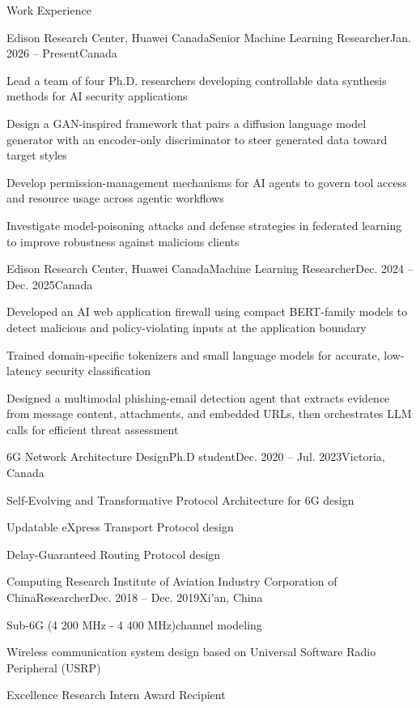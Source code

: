\documentclass[]{puyang-resume}
\begin{document}
\begin{section}{Work Experience}
    \begin{subsection}{Edison Research Center, Huawei Canada}{Senior Machine Learning Researcher}{Jan. 2026 -- Present}{Canada}
        \item Lead a team of four Ph.D. researchers developing controllable data synthesis methods for AI security applications
        \item Design a GAN-inspired framework that pairs a diffusion language model generator with an encoder-only discriminator to steer generated data toward target styles
        \item Develop permission-management mechanisms for AI agents to govern tool access and resource usage across agentic workflows
        \item Investigate model-poisoning attacks and defense strategies in federated learning to improve robustness against malicious clients
    \end{subsection}

    \begin{subsection}{Edison Research Center, Huawei Canada}{Machine Learning Researcher}{Dec. 2024 -- Dec. 2025}{Canada}
        \item Developed an AI web application firewall using compact BERT-family models to detect malicious and policy-violating inputs at the application boundary
        \item Trained domain-specific tokenizers and small language models for accurate, low-latency security classification
        \item Designed a multimodal phishing-email detection agent that extracts evidence from message content, attachments, and embedded URLs, then orchestrates LLM calls for efficient threat assessment
    \end{subsection}

    \begin{subsection}{6G Network Architecture Design}{Ph.D student}{Dec. 2020 -- Jul. 2023}{Victoria, Canada}
        \item Self-Evolving and Transformative Protocol Architecture for 6G design
        \item Updatable eXpress Transport Protocol design
        \item Delay-Guaranteed Routing Protocol design
    \end{subsection}

    \begin{subsection}{Computing Research Institute of Aviation Industry Corporation of China}{Researcher}{Dec. 2018 -- Dec. 2019}{Xi'an, China}
        \item Sub-6G (4 200 MHz - 4 400 MHz)channel modeling
        \item Wireless communication system design based on Universal Software Radio Peripheral (USRP)
        \item Excellence Research Intern Award Recipient
    \end{subsection}
\end{section}
\end{document}
